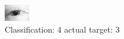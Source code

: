 \begin{figure}[h!]
\begin{center}
\includegraphics[width=0.60\columnwidth]{figures/ID15_class_4_target_3.png}
\end{center}
\caption{ Classification: 4 actual target: 3}
\label{fig:ID15_class_4_target_3}
\end{figure}
